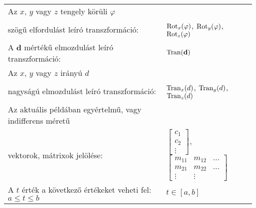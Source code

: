 \begin{tabular}{ll}
	Az $x$, $y$ vagy $z$ tengely körüli $\varphi$ & \\
	\hspace{15mm} szögű elfordulást leíró transzformáció:& $\mathrm{Rot}_x(\varphi)$, $\mathrm{Rot}_y(\varphi)$, $\mathrm{Rot}_z(\varphi)$ \\
	
	A $\mathbf d$ mértékű elmozdulást leíró transzformáció:& $\mathrm{Tran}(\mathbf d)$ \\
	
	Az $x$, $y$ vagy $z$ irányú $d$ & \\
	\hspace{15mm} nagyságú elmozdulást leíró transzformáció:& $\mathrm{Tran}_x(d)$, $\mathrm{Tran}_y(d)$, $\mathrm{Tran}_z(d)$ \\
	
	Az aktuális példában egyértelmű, vagy indifferens méretű & \\
	\hspace{15mm} vektorok, mátrixok jelölése: & $\begin{bmatrix}
		c_1 \\ c_2 \\ \vdots
	\end{bmatrix}$, $\begin{bmatrix}
		m_{11} & m_{12} & \dots \\
		m_{21} & m_{22} & \dots \\
		\vdots & \vdots &
	\end{bmatrix}$ \\

	A $t$ érték a következő értékeket veheti fel: $a\leq t\leq b$ & $t\in[a,b]$
	
\end{tabular}
